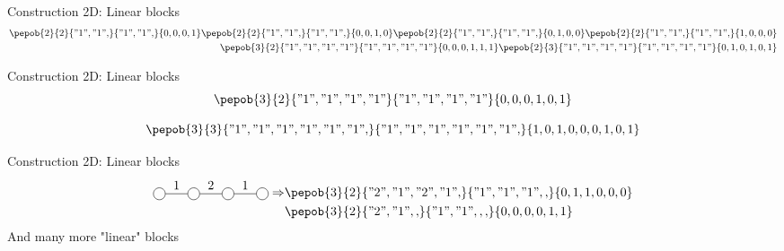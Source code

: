 \documentclass[aspectratio=169]{beamer}
\begin{document}
\begin{frame}{Construction 2D: Linear blocks}
    \begin{equation}
        \begin{split}
            \pepob{2}{2}{{"1","1",}}{{"1","1",}}{{0,0,0,1}}  \pepob{2}{2}{{"1","1",}}{{"1","1",}}{{0,0,1,0}}\pepob{2}{2}{{"1","1",}}{{"1","1",}}{{0,1,0,0}} \pepob{2}{2}{{"1","1",}}{{"1","1",}}{{1,0,0,0}}\\
            \pepob{3}{2}{{"1","1","1","1"}}{{"1","1","1","1"}}{{0,0,0,1,1,1}} \pepob{2}{3}{{"1","1","1","1"}}{{"1","1","1","1"}}{{0,1,0,1,0,1}}
        \end{split}
    \end{equation}
\end{frame}

\begin{frame}{Construction 2D: Linear blocks}
    \begin{equation}
        \pepob{3}{2}{{"1","1","1","1"}}{{"1","1","1","1"}}{{0,0,0,1,0,1}}
    \end{equation}

    \begin{equation}
        \pepob{3}{3}{{"1","1","1","1","1","1",}}{{"1","1","1","1","1","1",}}{{1,0,1,0,0,0,1,0,1}}
    \end{equation}
\end{frame}

\begin{frame}{Construction 2D: Linear blocks}
    \begin{equation}
        \begin{split}
            \mpob{4}{ {,"1","2","1",}  }{}{}{}{{,,,,,}} \Rightarrow &\pepob{3}{2}{{"2","1","2","1",}}{{"1","1","1",,}}{{0,1,1,0,0,0}}\\
            &\pepob{3}{2}{{"2","1",,}}{{"1","1",,,}}{{0,0,0,0,1,1}}
        \end{split}
    \end{equation}
    And many more "linear" blocks
\end{frame}

\end{document}
